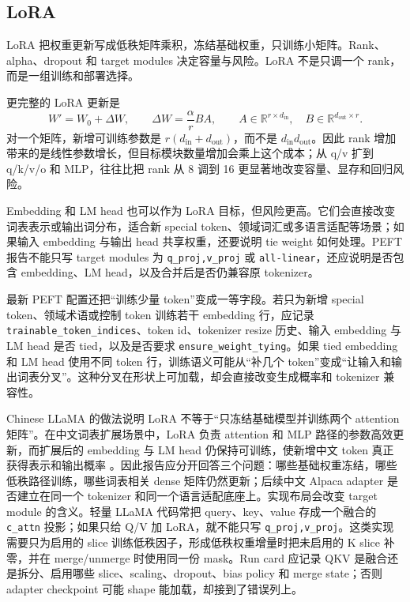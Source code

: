 \documentclass[UTF8,zihao=-4,openany]{ctexbook}
\begin{document}
\subsection{LoRA}
LoRA 把权重更新写成低秩矩阵乘积，冻结基础权重，只训练小矩阵。Rank、alpha、dropout 和 target modules 决定容量与风险。LoRA 不是只调一个 rank，而是一组训练和部署选择。

更完整的 LoRA 更新是
\[
  W'=W_0+\Delta W,\qquad
  \Delta W=\frac{\alpha}{r}BA,\qquad
  A\in\mathbb R^{r\times d_{\mathrm{in}}},\quad
  B\in\mathbb R^{d_{\mathrm{out}}\times r}.
\]
对一个矩阵，新增可训练参数是 $r(d_{\mathrm{in}}+d_{\mathrm{out}})$，而不是 $d_{\mathrm{in}}d_{\mathrm{out}}$。因此 rank 增加带来的是线性参数增长，但目标模块数量增加会乘上这个成本；从 q/v 扩到 q/k/v/o 和 MLP，往往比把 rank 从 8 调到 16 更显著地改变容量、显存和回归风险。

Embedding 和 LM head 也可以作为 LoRA 目标，但风险更高。它们会直接改变词表表示或输出词分布，适合新 special token、领域词汇或多语言适配等场景；如果输入 embedding 与输出 head 共享权重，还要说明 tie weight 如何处理。PEFT 报告不能只写 target modules 为 \texttt{q\_proj,v\_proj} 或 \texttt{all-linear}，还应说明是否包含 embedding、LM head，以及合并后是否仍兼容原 tokenizer。

最新 PEFT 配置还把“训练少量 token”变成一等字段。若只为新增 special token、领域术语或控制 token 训练若干 embedding 行，应记录 \texttt{trainable\_token\_indices}、token id、tokenizer resize 历史、输入 embedding 与 LM head 是否 tied，以及是否要求 \texttt{ensure\_weight\_tying}。如果 tied embedding 和 LM head 使用不同 token 行，训练语义可能从“补几个 token”变成“让输入和输出词表分叉”。这种分叉在形状上可加载，却会直接改变生成概率和 tokenizer 兼容性。

Chinese LLaMA 的做法说明 LoRA 不等于“只冻结基础模型并训练两个 attention 矩阵”。在中文词表扩展场景中，LoRA 负责 attention 和 MLP 路径的参数高效更新，而扩展后的 embedding 与 LM head 仍保持可训练，使新增中文 token 真正获得表示和输出概率 \cite{cui2023efficient}。因此报告应分开回答三个问题：哪些基础权重冻结，哪些低秩路径训练，哪些词表相关 dense 矩阵仍然更新；后续中文 Alpaca adapter 是否建立在同一个 tokenizer 和同一个语言适配底座上。实现布局会改变 target module 的含义。轻量 LLaMA 代码常把 query、key、value 存成一个融合的 \texttt{c\_attn} 投影；如果只给 Q/V 加 LoRA，就不能只写 \texttt{q\_proj,v\_proj}。这类实现需要只为启用的 slice 训练低秩因子，形成低秩权重增量时把未启用的 K slice 补零，并在 merge/unmerge 时使用同一份 mask。Run card 应记录 QKV 是融合还是拆分、启用哪些 slice、scaling、dropout、bias policy 和 merge state；否则 adapter checkpoint 可能 shape 能加载，却接到了错误列上。
\end{document}
